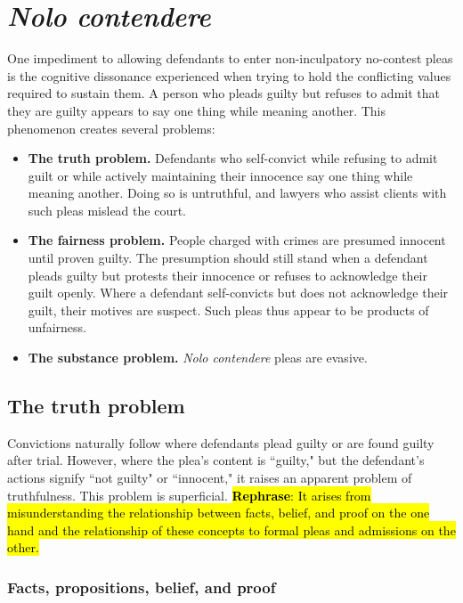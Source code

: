 \section{\textit{Nolo contendere}}

One impediment to allowing defendants to enter non-inculpatory no-contest pleas is the cognitive dissonance experienced when trying to hold the conflicting values required to sustain them. A person who pleads guilty but refuses to admit that they are guilty appears to say one thing while meaning another. This phenomenon creates several problems:

\begin{itemize}
    \item \textbf{The truth problem.} Defendants who self-convict while refusing to admit guilt or while actively maintaining their innocence say one thing while meaning another. Doing so is untruthful, and lawyers who assist clients with such pleas mislead the court. 
    \item \textbf{The fairness problem.} People charged with crimes are presumed innocent until proven guilty. The presumption should still stand when a defendant pleads guilty but protests their innocence or refuses to acknowledge their guilt openly. Where a defendant self-convicts but does not acknowledge their guilt, their motives are suspect. Such pleas thus appear to be products of unfairness. 
    \item \textbf{The substance problem.} \textit{Nolo contendere} pleas are evasive.
\end{itemize}

\subsection{The truth problem}

Convictions naturally follow where defendants plead guilty or are found guilty after trial. However, where the plea's content is ``guilty," but the defendant's actions signify ``not guilty" or ``innocent," it raises an apparent problem of truthfulness. This problem is superficial. \hl{\textbf{Rephrase}: It arises from misunderstanding the relationship between facts, belief, and proof on the one hand and the relationship of these concepts to formal pleas and admissions on the other.}

\subsubsection{Facts, propositions, belief, and proof}

